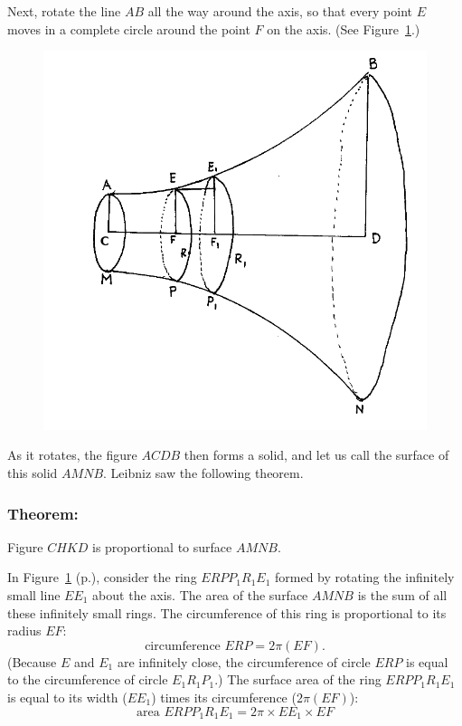 \documentclass[twoside,openright]{article}
\begin{document}
Next, rotate the line $AB$ all the way around the axis, so that every
point $E$ moves in a complete circle around the point $F$ on the
axis. (See Figure~\ref{rotate}.)
\begin{figure}[ht]
\begin{center}
\includegraphics[width=\textwidth]{fig/Figure45a}
\caption{}
\label{rotate}
\vspace{-10pt}
\end{center}
\end{figure} As it rotates, the figure $ACDB$ then forms a solid, and
let us call the surface of this solid $AMNB$.  Leibniz saw the
following theorem.

\subsubsection*{Theorem:}

Figure $CHKD$ is proportional to surface $AMNB$.

\hspace{1ex}


In Figure~\ref{rotate} (p.\pageref{rotate}), consider the ring $ERPP_1R_1E_1$ formed by
rotating the infinitely small line $EE_1$ about the axis.  The area of
the surface $AMNB$ is the sum of all these infinitely small rings.
The circumference of this ring is proportional to its radius $EF$:
$$\mbox{circumference }ERP = 2\pi(EF).$$
(Because $E$ and $E_1$ are infinitely close, the circumference of
circle $ERP$ is equal to the circumference of circle $E_1R_1P_1$.)
The surface area of the ring $ERPP_1R_1E_1$ is equal to its width
($EE_1$) times its circumference ($2\pi (EF)$):
\setcounter{equation}{0}
\begin{equation}
\mbox{area }ERPP_1R_1E_1 = 2\pi \times EE_1 \times EF
\end{equation}
\end{document}
